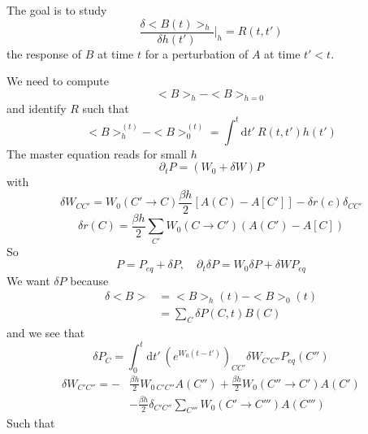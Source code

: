 \documentclass[a4paper]{book}
\theoremstyle{definition}
\theoremstyle{remark}
\begin{document}
The goal is to study 
\begin{equation}
    \frac{\delta<B(t)>_h}{\delta h(t')}\Bigg|_h = R(t, t')
\end{equation}
the response of $B$ at time $t$ for a perturbation of $A$ at time $t'< t$. \par \medskip 

We need to compute 
\begin{equation}
    <B>_h - <B>_{h=0}
\end{equation}
and identify $R$ such that 
\begin{equation}
    <B>_h^{(t)} - <B>_0^{(t)} = \int^t \text{d}t'~ R(t, t')h(t')
\end{equation}
The master equation reads for small $h$
\begin{equation}
    \partial_t P = (W_0 + \delta W)P
\end{equation}
with 
\begin{equation}
    \delta W_{CC'} = W_0(C'\rightarrow C)\frac{\beta h}{2} [A(C) - A[C']] -\delta r(c)\delta_{CC'}
\end{equation}
\begin{equation}
    \delta r(C) =\frac{\beta h}{2} \sum_{C'} W_0(C\rightarrow C')(A(C') - A[C])
\end{equation}
So
\begin{equation}
    P = P_{eq} + \delta P, \quad \partial_t \delta P = W_0 \delta P + \delta W P_{eq} 
\end{equation}
We want $\delta P$ because 
\begin{equation}
    \begin{aligned}
        \delta <B> &= <B>_h (t) - <B>_0 (t)\\
        &= \sum_C \delta P(C, t) B(C)
    \end{aligned}
\end{equation}
and we see that 
\begin{equation}
    \delta P_C = \int_{0}^{t}\text{d}t'~ (e^{W_0(t-t')})_{CC'} \delta W_{C'C''}P_{eq}(C'') 
\end{equation}
\begin{equation}
    \begin{aligned}
        \delta W_{C'C''} = -&\frac{\beta h}{2}W_{0~C'C''}A(C'') + \frac{\beta h}{2}W_0 (C'' \rightarrow C')A(C') \\
    &- \frac{\beta h}{2}\delta_{C'C''}\sum_{C'''} W_0 (C'\rightarrow C''')A(C''')
    \end{aligned}
\end{equation}
Such that 
\end{document}

